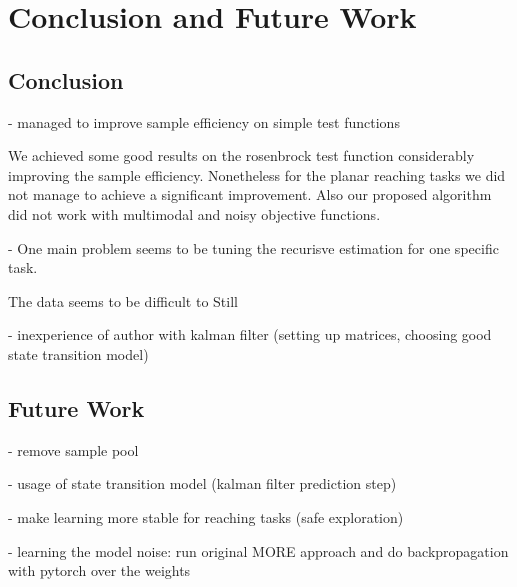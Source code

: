 
\chapter{Conclusion and Future Work}


\section{Conclusion}
- managed to improve sample efficiency on simple test functions

We achieved some good results on the rosenbrock test function
considerably improving the sample efficiency. Nonetheless for
the planar reaching tasks we did not manage to achieve a
significant improvement.
Also our proposed algorithm did not work with multimodal and noisy objective functions.

- One main problem seems to be tuning the recurisve estimation for one specific
task.

The data seems to be difficult to Still

- inexperience of author with kalman filter (setting up matrices, choosing good state transition model)

\section{Future Work}
- remove sample pool

- usage of state transition model (kalman filter prediction step)

- make learning more stable for reaching tasks (safe exploration)

- learning the model noise: run original MORE approach and do backpropagation with pytorch over the
weights
